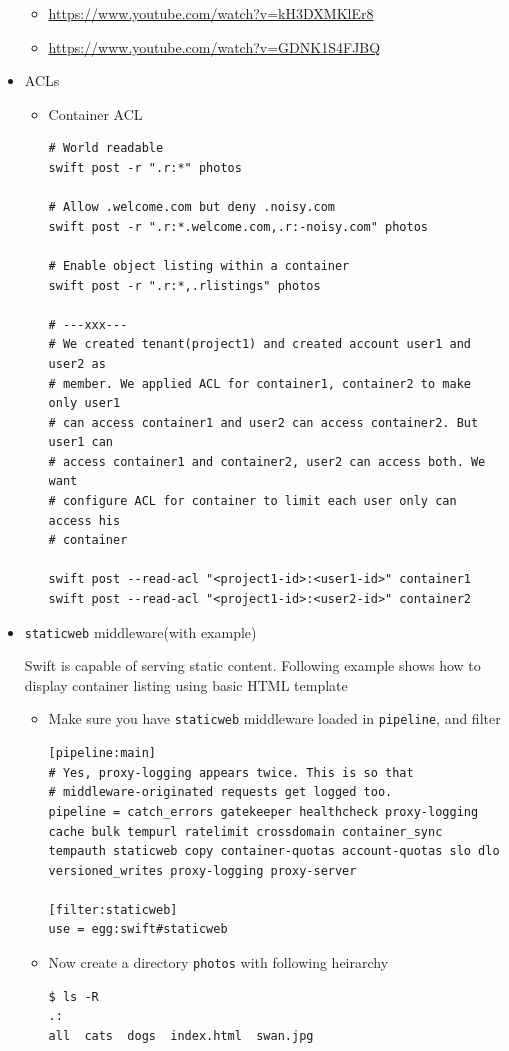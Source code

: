 \documentclass{article}
\begin{document}
\begin{itemize}
\begin{itemize}
\item \url{https://www.youtube.com/watch?v=kH3DXMKlEr8}
\item \url{https://www.youtube.com/watch?v=GDNK1S4FJBQ}
\end{itemize}

\item ACLs
\begin{itemize}
\item Container ACL
\begin{verbatim}
# World readable
swift post -r ".r:*" photos

# Allow .welcome.com but deny .noisy.com
swift post -r ".r:*.welcome.com,.r:-noisy.com" photos

# Enable object listing within a container
swift post -r ".r:*,.rlistings" photos

# ---xxx---
# We created tenant(project1) and created account user1 and user2 as
# member. We applied ACL for container1, container2 to make only user1
# can access container1 and user2 can access container2. But user1 can
# access container1 and container2, user2 can access both. We want
# configure ACL for container to limit each user only can access his
# container

swift post --read-acl "<project1-id>:<user1-id>" container1
swift post --read-acl "<project1-id>:<user2-id>" container2
\end{verbatim}
\end{itemize}

\item \texttt{staticweb} middleware(with example)

Swift is capable of serving static content. Following example shows
how to display container listing using basic HTML template
\begin{itemize}
\item Make sure you have \texttt{staticweb} middleware loaded in \texttt{pipeline},
and filter
\begin{verbatim}
[pipeline:main]
# Yes, proxy-logging appears twice. This is so that
# middleware-originated requests get logged too.
pipeline = catch_errors gatekeeper healthcheck proxy-logging cache bulk tempurl ratelimit crossdomain container_sync tempauth staticweb copy container-quotas account-quotas slo dlo versioned_writes proxy-logging proxy-server

[filter:staticweb]
use = egg:swift#staticweb
\end{verbatim}

\item Now create a directory \texttt{photos} with following heirarchy
\begin{verbatim}
$ ls -R
.:
all  cats  dogs  index.html  swan.jpg


\end{verbatim}
\end{itemize}
\end{itemize}
\end{document}
